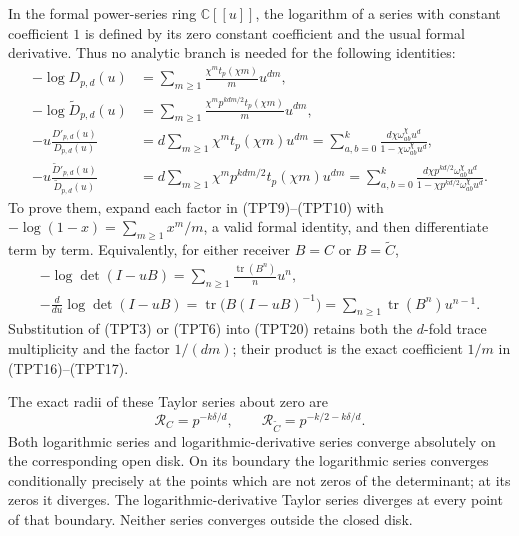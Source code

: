 In the formal power-series ring $\mathbb C[[u]]$, the logarithm of a
series with constant coefficient $1$ is defined by its zero constant
coefficient and the usual formal derivative. Thus no analytic branch
is needed for the following identities:
\begin{align}
 -\log D_{p,d}(u)
   &=\sum_{m\ge1}\frac{\chi^m t_p(\chi m)}{m}u^{dm},\tag{TPT16}\\
 -\log\widetilde D_{p,d}(u)
   &=\sum_{m\ge1}\frac{\chi^m p^{kdm/2}t_p(\chi m)}{m}u^{dm},
       \tag{TPT17}\\
 -u\frac{D'_{p,d}(u)}{D_{p,d}(u)}
   &=d\sum_{m\ge1}\chi^m t_p(\chi m)u^{dm}
     =\sum_{a,b=0}^k\frac{d\chi\omega_{ab}^{\chi}u^d}
                               {1-\chi\omega_{ab}^{\chi}u^d},
       \tag{TPT18}\\
 -u\frac{\widetilde D'_{p,d}(u)}{\widetilde D_{p,d}(u)}
   &=d\sum_{m\ge1}\chi^m p^{kdm/2}t_p(\chi m)u^{dm}
     =\sum_{a,b=0}^k
       \frac{d\chi p^{kd/2}\omega_{ab}^{\chi}u^d}
            {1-\chi p^{kd/2}\omega_{ab}^{\chi}u^d}.
       \tag{TPT19}
\end{align}
To prove them, expand each factor in (TPT9)--(TPT10) with
$-\log(1-x)=\sum_{m\ge1}x^m/m$, a valid formal identity, and
then differentiate term by term. Equivalently, for either receiver
$B=C$ or $B=\widetilde C$,
\begin{equation}\tag{TPT20}
 \begin{gathered}
 -\log\det(I-uB)=\sum_{n\ge1}\frac{\operatorname{tr}(B^n)}n u^n,
 \\
 -\frac{d}{du}\log\det(I-uB)
     =\operatorname{tr}\bigl(B(I-uB)^{-1}\bigr)
     =\sum_{n\ge1}\operatorname{tr}(B^n)u^{n-1}.
 \end{gathered}
\end{equation}
Substitution of (TPT3) or (TPT6) into (TPT20) retains both the
$d$-fold trace multiplicity and the factor $1/(dm)$; their product is
the exact coefficient $1/m$ in (TPT16)--(TPT17).

The exact radii of these Taylor series about zero are
\begin{equation}\tag{TPT21}
 \mathcal R_C=p^{-k\delta/d},\qquad
 \mathcal R_{\widetilde C}=p^{-k/2-k\delta/d}.
\end{equation}
Both logarithmic series and logarithmic-derivative series converge
absolutely on the corresponding open disk. On its boundary the
logarithmic series converges conditionally precisely at the points
which are not zeros of the determinant; at its zeros it diverges.
The logarithmic-derivative Taylor series diverges at every point of
that boundary. Neither series converges outside the closed disk.

